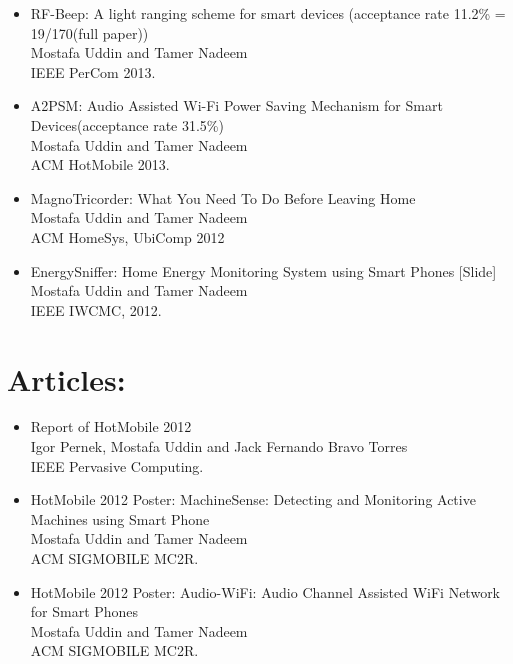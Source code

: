 \documentclass[margin]{res}
\begin{document}
\begin{resume}
\begin{itemize}
\item RF-Beep: A light ranging scheme for smart devices (acceptance rate 11.2\% = 19/170(full paper))\\
Mostafa Uddin and Tamer Nadeem\\ 
IEEE PerCom 2013. 

\item A2PSM: Audio Assisted Wi-Fi Power Saving Mechanism for Smart Devices(acceptance rate 31.5\%)\\ 
Mostafa Uddin and Tamer Nadeem\\ 
ACM HotMobile 2013. 

\item MagnoTricorder: What You Need To Do Before Leaving Home\\ 
Mostafa Uddin and Tamer Nadeem\\ 
ACM HomeSys, UbiComp 2012 

\item EnergySniffer: Home Energy Monitoring System using Smart Phones [Slide]\\ 
Mostafa Uddin and Tamer Nadeem\\ 
IEEE IWCMC, 2012. 

 \end{itemize}
           
\section{Articles:}
\begin{itemize} \itemsep -2pt

\item Report of HotMobile 2012\\
Igor Pernek, Mostafa Uddin and Jack Fernando Bravo Torres\\ 
IEEE Pervasive Computing. 

\item HotMobile 2012 Poster: MachineSense: Detecting and Monitoring Active Machines using Smart Phone\\ 
Mostafa Uddin and Tamer Nadeem\\ 
ACM SIGMOBILE MC2R. 

\item HotMobile 2012 Poster: Audio-WiFi: Audio Channel Assisted WiFi Network for Smart Phones\\ 
Mostafa Uddin and Tamer Nadeem\\ 
ACM SIGMOBILE MC2R. 

 \end{itemize}
 

\end{resume}
\end{document}
